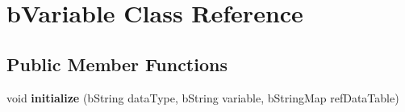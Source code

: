 \hypertarget{classb_variable}{\section{b\+Variable Class Reference}
\label{classb_variable}
}
\subsection*{Public Member Functions}
\begin{DoxyCompactItemize}
\item 
\hypertarget{classb_variable_ae813c300c8e32f6d40fcf9f9f185b687}{void {\bfseries initialize} (b\+String data\+Type, b\+String variable, b\+String\+Map ref\+Data\+Table)}\label{classb_variable_ae813c300c8e32f6d40fcf9f9f185b687}

\end{DoxyCompactItemize}
